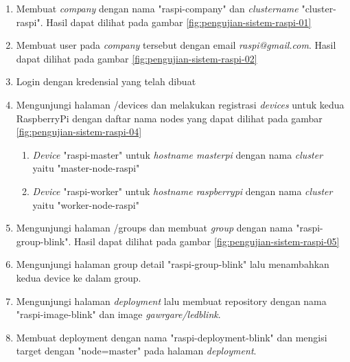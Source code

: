 \begin{enumerate}
  \item Membuat \textit{company} dengan nama "raspi-company" dan \textit{cluster\textunderscore name} "cluster-raspi". Hasil dapat dilihat pada gambar \ref{fig:pengujian-sistem-raspi-01}
  \item Membuat user pada \textit{company} tersebut dengan email \textit{raspi@gmail.com}. Hasil dapat dilihat pada gambar \ref{fig:pengujian-sistem-raspi-02}
  \item Login dengan kredensial yang telah dibuat
  \item Mengunjungi halaman /devices dan melakukan registrasi \textit{devices} untuk kedua RaspberryPi dengan daftar nama nodes yang dapat dilihat pada gambar \ref{fig:pengujian-sistem-raspi-04}
        \begin{enumerate}
          \item \textit{Device} "raspi-master" untuk \textit{hostname masterpi} dengan nama \textit{cluster} yaitu "master-node-raspi"
          \item  \textit{Device} "raspi-worker" untuk \textit{hostname raspberrypi} dengan nama \textit{cluster} yaitu "worker-node-raspi"
        \end{enumerate}
  \item Mengunjungi halaman /groups dan membuat \textit{group} dengan nama "raspi-group-blink". Hasil dapat dilihat pada gambar \ref{fig:pengujian-sistem-raspi-05}
  \item Mengunjungi halaman group detail "raspi-group-blink" lalu menambahkan kedua device ke dalam group.
  \item Mengunjungi halaman \textit{deployment} lalu membuat repository dengan nama "raspi-image-blink" dan image\textit{ gawrgare/led\textunderscore blink}.
  \item Membuat deployment dengan nama "raspi-deployment-blink" dan mengisi target dengan "node=master" pada halaman \textit{deployment}.
\end{enumerate}

